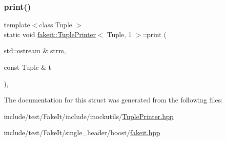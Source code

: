 \mbox{\label{structfakeit_1_1TuplePrinter_3_01Tuple_00_011_01_4_adf9fadff296532b4a997e6d76dae23bb}} 
\subsubsection{\texorpdfstring{print()}{print()}\hspace{0.1cm}{\footnotesize\ttfamily [9/9]}}
{\footnotesize\ttfamily template$<$class Tuple $>$ \\
static void \mbox{\hyperlink{structfakeit_1_1TuplePrinter}{fakeit\+::\+Tuple\+Printer}}$<$ Tuple, 1 $>$\+::print (\begin{DoxyParamCaption}\item[{std\+::ostream \&}]{strm,  }\item[{const Tuple \&}]{t }\end{DoxyParamCaption})\hspace{0.3cm}{\ttfamily [inline]}, {\ttfamily [static]}}



The documentation for this struct was generated from the following files\+:\begin{DoxyCompactItemize}
\item 
include/test/\+Fake\+It/include/mockutils/\mbox{\hyperlink{TuplePrinter_8hpp}{Tuple\+Printer.\+hpp}}\item 
include/test/\+Fake\+It/single\+\_\+header/boost/\mbox{\hyperlink{single__header_2boost_2fakeit_8hpp}{fakeit.\+hpp}}\end{DoxyCompactItemize}
